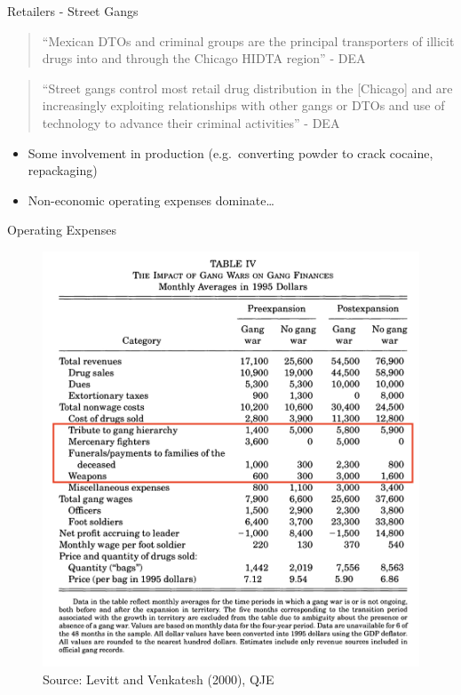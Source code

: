 \documentclass[10pt,ignorenonframetext,]{beamer}
\providecommand{\tightlist}{%
  \setlength{\itemsep}{0pt}\setlength{\parskip}{0pt}}
\begin{document}
\begin{frame}{Retailers - Street Gangs}
\protect\hypertarget{retailers---street-gangs}{}

\begin{quote}
``Mexican DTOs and criminal groups are the principal transporters of
illicit drugs into and through the Chicago HIDTA region'' - DEA
\end{quote}

\begin{quote}
``Street gangs control most retail drug distribution in the
{[}Chicago{]} and are increasingly exploiting relationships with other
gangs or DTOs and use of technology to advance their criminal
activities'' - DEA
\end{quote}

\begin{itemize}
\tightlist
\item
  Some involvement in production (e.g.~converting powder to crack
  cocaine, repackaging)
\item
  Non-economic operating expenses dominate\ldots{}
\end{itemize}

\end{frame}

\begin{frame}{Operating Expenses}
\protect\hypertarget{operating-expenses}{}

\begin{figure}
\centering
\includegraphics{../chicago/figs/lv_table4.png}
\caption{Source: Levitt and Venkatesh (2000), QJE}
\end{figure}

\end{frame}
\end{document}
